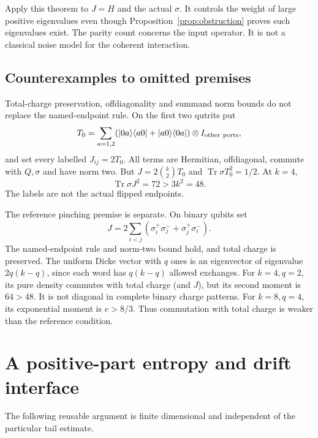 \documentclass[11pt]{article}
\newcommand{\Tr}{\operatorname{Tr}}
\newcommand{\ket}[1]{\lvert #1\rangle}
\newcommand{\bra}[1]{\langle #1\rvert}
\begin{document}
Apply this theorem to \(J=H\) and the actual \(\sigma\). It controls
the weight of large positive eigenvalues even though
Proposition~\ref{prop:obstruction} proves such eigenvalues exist.
The parity count concerns the input operator. It is not a classical
noise model for the coherent interaction.

\subsection{Counterexamples to omitted premises}

Total-charge preservation, offdiagonality and summand norm bounds do not
replace the named-endpoint rule. On the first two qutrits put
\[
 T_0=\sum_{a=1,2}(\ket{0a}\bra{a0}+\ket{a0}\bra{0a})
       \otimes I_{\rm other\ ports},
\]
and set every labelled \(J_{ij}=2T_0\).
All terms are Hermitian, offdiagonal, commute with \(Q,\sigma\) and
have norm two. But \(J=2\binom{k}{2}T_0\) and
\(\Tr\sigma T_0^2=1/2\). At \(k=4\),
\[
 \Tr\sigma J^2=72>3k^2=48.
\]
The labels are not the actual flipped endpoints.

The reference pinching premise is separate. On binary qubits set
\[
 J=2\sum_{i<j}
   (\sigma_i^+\sigma_j^-+\sigma_j^+\sigma_i^-).
\]
The named-endpoint rule and norm-two bound hold, and total charge is
preserved. The uniform Dicke vector with \(q\) ones is an eigenvector
of eigenvalue \(2q(k-q)\), since each word has \(q(k-q)\) allowed exchanges.
For \(k=4,q=2\), its pure density commutes with total charge (and \(J\)),
but its second moment is \(64>48\).
It is not diagonal in complete binary charge patterns.
For \(k=8,q=4\), its exponential moment is \(e>8/3\).
Thus commutation with total charge is weaker than the reference condition.

\section{A positive-part entropy and drift interface}

The following reusable argument is finite dimensional and independent of
the particular tail estimate.
\end{document}
